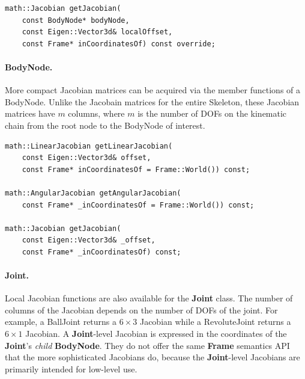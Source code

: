 \begin{lstlisting}[caption=Skeleton.h]
math::Jacobian getJacobian(
    const BodyNode* bodyNode, 
    const Eigen::Vector3d& localOffset, 
    const Frame* inCoordinatesOf) const override;
\end{lstlisting}






\paragraph{BodyNode.} More compact Jacobian matrices can be acquired
via the member functions of a BodyNode. Unlike the Jacobain matrices
for the entire Skeleton, these Jacobian matrices have $m$ columns, where $m$ is the number of DOFs on the kinematic chain from the root node to the BodyNode of interest.


\begin{lstlisting}[caption=BodyNode.h]
math::LinearJacobian getLinearJacobian(
    const Eigen::Vector3d& offset, 
    const Frame* inCoordinatesOf = Frame::World()) const;

math::AngularJacobian getAngularJacobian(
    const Frame* _inCoordinatesOf = Frame::World()) const;

math::Jacobian getJacobian(
    const Eigen::Vector3d& _offset, 
    const Frame* _inCoordinatesOf) const;
\end{lstlisting}

\paragraph{Joint.} Local Jacobian functions are also available for
the \textbf{Joint} class. The number of columns of the Jacobian depends on the
number of DOFs of the joint. For example, a BallJoint returns a $6
\times 3$ Jacobian while a RevoluteJoint returns a $6 \times 1$ Jacobian. A \textbf{Joint}-level Jacobian is expressed in the coordinates of the \textbf{Joint}'s \textit{child} \textbf{BodyNode}. They do not offer the same \textbf{Frame} semantics API that the more sophisticated Jacobians do, because the \textbf{Joint}-level Jacobians are primarily intended for low-level use.

